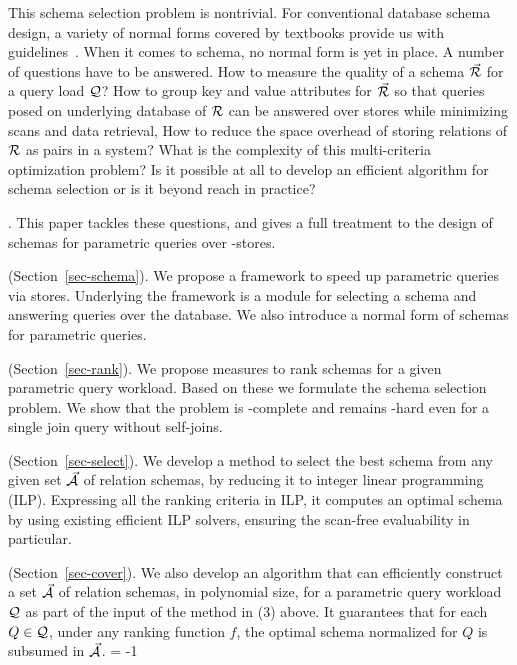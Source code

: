 \vspace{0.36ex}
This schema selection problem is nontrivial.
For conventional database schema design, a variety of
normal forms covered by textbooks provide us with
guidelines~\cite{AbHuVi1995}.
When it comes to \baav schema, no normal form is
yet in place. A number of questions have to be answered.
How to measure
the quality of a \baav schema $\vec{{\mathcal R}}$ for a query load $\mathcal Q$?
How to group key and value attributes for $\vec{{\mathcal R}}$
so that queries posed on underlying database of ${\mathcal R}$
can be answered over \kv stores while minimizing scans and
data retrieval, 
How to reduce the space overhead of
storing relations of ${\mathcal R}$ as \baav pairs 
in a \kv system?
What is the complexity of this multi-criteria
optimization problem? Is it possible at
all to develop an efficient algorithm for schema
selection or is it beyond reach in practice?


. This paper tackles these
questions, and gives a full treatment to the design of
\baav schemas for parametric \SQL queries over \kv-stores.

 (Section~\ref{sec-schema}). We propose a
framework to speed up parametric \SQL queries via \baav stores.
Underlying the framework is a module for selecting a \baav schema
and answering queries over the \baav database. We also introduce
a normal form of \baav schemas for parametric \SQL queries.

 (Section~\ref{sec-rank}).
We propose measures to rank \baav schemas for a
given parametric query workload. Based on these
we formulate the \baav schema selection problem.
We show that the problem is \NP-complete and remains \NP-hard
even for a single join query without self-joins.

 (Section~\ref{sec-select}). 
We develop a method to select the best \baav  schema 
from any given set $\vec{{\mathcal A}}$ of \baav relation schemas, by reducing it to 
integer linear programming (ILP). Expressing all the ranking
criteria in ILP, it computes an optimal \baav
schema by using existing efficient ILP solvers,
ensuring the scan-free evaluability in particular.

 (Section~\ref{sec-cover}).
We also develop an algorithm that can efficiently construct a
set $\vec{{\mathcal A}}$ of \baav relation schemas, in polynomial
size, for a parametric query workload $\mathcal Q$ as part of the input
of the method in (3) above. It guarantees that for each $Q\in \mathcal Q$, under
any ranking function $f$, the optimal \baav schema
normalized for $Q$ is subsumed in $\vec{{\mathcal A}}$.
\looseness = -1

